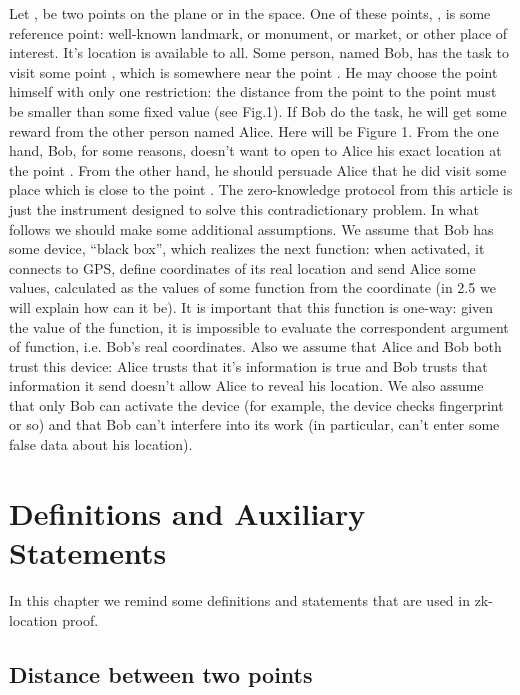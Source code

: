 \documentclass{article}
\begin{document}
Let     ,      be two points on the plane or in the space.
One of these points,     , is some reference point: well-known landmark, or monument, or market, or other place of interest.
It’s location is available to all.
Some person, named Bob, has the task to visit some point     , which is somewhere near the point     .
He may choose the point      himself with only one restriction: the distance from the point      
to the point      must be smaller than some fixed value (see Fig.1).
If Bob do the task, he will get some reward from the other person named Alice.
Here will be Figure 1.
From the one hand, Bob, for some reasons, doesn’t want to open to Alice his exact location at the point     .
From the other hand, he should persuade Alice that he did visit some place which is close to the point     .
The zero-knowledge protocol from this article is just the instrument designed to solve this contradictionary problem.
In what follows we should make some additional assumptions.
We assume that Bob has some device, “black box”, which realizes the next function: when activated, it connects to GPS,
define coordinates of its real location and send Alice some values, calculated as the values of some function from the coordinate (in 2.5 we will explain how can it be).
It is important that this function is one-way: given the value of the function, it is impossible to evaluate the correspondent argument of function, i.e. Bob’s real coordinates.
Also we assume that Alice and Bob both trust this device: Alice trusts that it’s information is true and Bob trusts that information it send doesn’t allow Alice to reveal his location.
We also assume that only Bob can activate the device (for example, the device checks fingerprint or so) and that Bob can’t interfere into its work (in particular,
can’t enter some false data about his location).

\section{Definitions and Auxiliary Statements}

In this chapter we remind some definitions and statements that are used in zk-location proof.

\subsection{Distance between two points}  %
\end{document}
